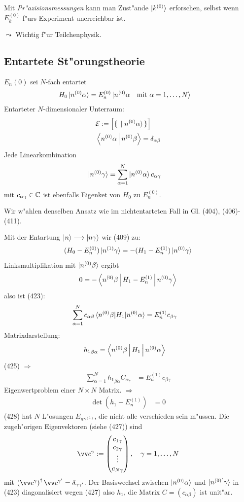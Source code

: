 \documentclass[a4paper]{scrartcl}
\newcommand{\CC}{\ensuremath \mathbb{C}}
\newcommand{\matr}[1]{\begin{pmatrix} #1 \end{pmatrix}}
\newcommand{\eqn}[1]{\begin{align} #1 \end{align}}
\begin{document}
Mit \emph{Pr"azisionsmessungen } kann man Zust"ande $\ket {k^{(0)}}$ erforschen, selbst wenn $E_k^{(0)}$ f"urs Experiment unerreichbar ist.

$\leadsto$ Wichtig f"ur Teilchenphysik.

\subsection{Entartete St"orungstheorie}

$E_n{(0)}$ sei $N$-fach entartet
\eqn{H_0 \ket{ n^{(0)} \alpha} & = E_n^{(0)} \ket{n^{(0)} \alpha \quad \mathrm{ mit \ } \alpha =1, \ldots,N}} 
Entarteter $N$-dimensionaler Unterraum:
\eqn{
 & \mathcal E:= \left[ \set{ \ket{ n^{(0)}\alpha} } \right] \\
&\Braket{ n^{(0)} \alpha | n^{(0)} \beta }  = \delta_{\alpha \beta}
}
Jede Linearkombination 
\eqn{ \ket{ n^{(0)} \gamma } & = \sum_{\alpha=1}^N \ket{n^{(0)} \alpha } c_{\alpha \gamma}}
mit $c_{\alpha \gamma} \in \CC$ ist ebenfalls Eigenket von $H_0$ zu $E_n^{(0)}$.

Wir w"ahlen denselben Ansatz wie im nichtentarteten Fall in Gl. (404), (406)-(411).

Mit der Entartung $\ket n \longrightarrow \ket{ n \gamma}$ wir (409) zu:
$$(H_0 - E_n^{(0)}) \ket{ n^{(1)} \gamma} = - (H_1 - E_n^{(1)}) \ket{n ^{(0)} \gamma}$$
Linksmultiplikation mit $\ket{n^{(0)} \beta}$ ergibt
\eqn{ 0 = - \Braket{n^{(0)} \beta | H_1 - E_n^{(1)} | n^{(0)} \gamma}}
also ist (423):
\eqn{ \sum_{\alpha=1}^N c_{\alpha \beta} \braket{ n^{(0)} \beta | H_1 | n^{(0)} \alpha } & = E_n^{(1)} c_{\beta \gamma}}
Matrixdarstellung:
\eqn{ {h_1}_{\beta \alpha} &  = \Braket{ n^{(0)} \beta | H_1 | n^{(0)} \alpha}}
(425) $\Longrightarrow$
\eqn{ \sum_{\alpha=1}^N {h_1}_{\beta \alpha} C_{\alpha_\gamma} & = E_n^{(1)} c_{\beta \gamma}}
Eigenwertproblem einer $N \times N$ Matrix.
$\Longrightarrow$
\eqn{\det \left( h_1 - E_n^{(1)} \right) & = 0}
(428) hat $N$ L"osungen $E_{n\gamma^{(1)}}$, die nicht alle verschieden sein m"ussen. Die zugeh"origen Eigenvektoren (siehe (427)) sind
\eqn{ \vv c^\gamma := \matr{ c_{1 \gamma} \\ c_{2 \gamma} \\ \vdots \\ c_{N \gamma} }, \quad \gamma=1, \ldots, N}
mit $\left( \vv c^\gamma \right)^\dagger \vv c^{\gamma'} = \delta_{\gamma \gamma'}$. Der Basiswechsel zwischen $\ket{ n^{(0)} \alpha}$ und $\ket{ n^{(0)'} \gamma}$ in (423) diagonalisiert wegen (427) also $h_1$, die Matrix $C=(c_{\alpha \beta})$ ist unit"ar.
\end{document}
